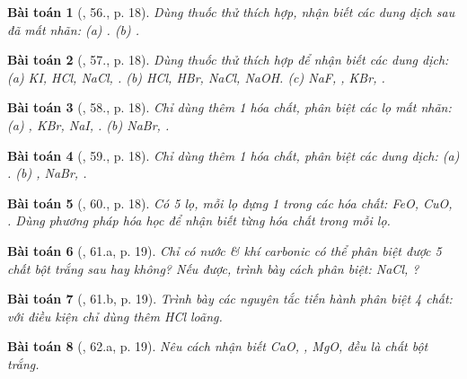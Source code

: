 \documentclass{article}
\newtheorem{baitoan}{Bài toán}
\begin{document}
\begin{baitoan}[\cite{An_400_BT_Hoa_Hoc_9}, 56., p. 18]
	Dùng thuốc thử thích hợp, nhận biết các dung dịch sau đã mất nhãn: {\rm(a) . (b) }.
\end{baitoan}

\begin{baitoan}[\cite{An_400_BT_Hoa_Hoc_9}, 57., p. 18]
	Dùng thuốc thử thích hợp để nhận biết các dung dịch: {\rm(a) KI, HCl, NaCl, . (b) HCl, HBr, NaCl, NaOH. (c) NaF, , KBr, }.
\end{baitoan}

\begin{baitoan}[\cite{An_400_BT_Hoa_Hoc_9}, 58., p. 18]
	Chỉ dùng thêm 1 hóa chất, phân biệt các lọ mất nhãn: {\rm(a) , KBr, NaI, . (b) NaBr, }.
\end{baitoan}

\begin{baitoan}[\cite{An_400_BT_Hoa_Hoc_9}, 59., p. 18]
	Chỉ dùng thêm 1 hóa chất, phân biệt các dung dịch: {\rm(a) . (b) , NaBr, }.
\end{baitoan}

\begin{baitoan}[\cite{An_400_BT_Hoa_Hoc_9}, 60., p. 18]
	Có 5 lọ, mỗi lọ đựng 1 trong các hóa chất: {\rm FeO, CuO, }. Dùng phương pháp hóa học để nhận biết từng hóa chất trong mỗi lọ.
\end{baitoan}

\begin{baitoan}[\cite{An_400_BT_Hoa_Hoc_9}, 61.a, p. 19]
	Chỉ có nước \& khí carbonic có thể phân biệt được 5 chất bột trắng sau hay không? Nếu được, trình bày cách phân biệt: {\rm NaCl, }? 
\end{baitoan}

\begin{baitoan}[\cite{An_400_BT_Hoa_Hoc_9}, 61.b, p. 19]
	Trình bày các nguyên tắc tiến hành phân biệt 4 chất: {\rm{}} với điều kiện chỉ dùng thêm {\rm HCl} loãng.
\end{baitoan}

\begin{baitoan}[\cite{An_400_BT_Hoa_Hoc_9}, 62.a, p. 19]
	Nêu cách nhận biết {\rm CaO, , MgO, } đều là chất bột trắng.
\end{baitoan}
\end{document}
